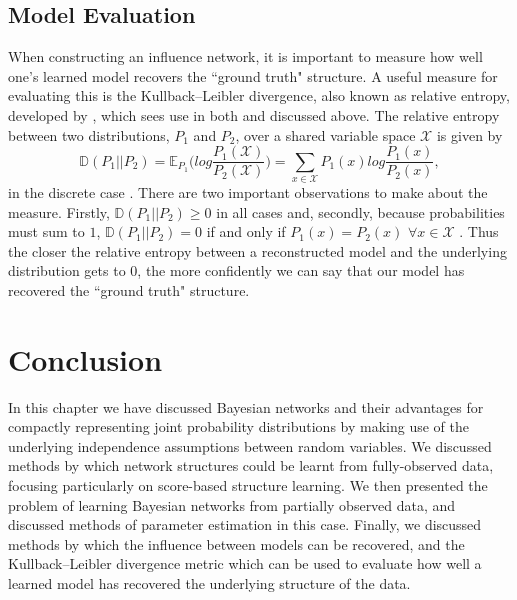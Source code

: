 \documentclass [11pt]{article}
\begin{document}
\subsection{Model Evaluation}\label{ModelEvaluation}
When constructing an influence network, it is important to measure how well one's learned model recovers the ``ground truth" structure. A useful measure for evaluating this is the Kullback–Leibler divergence, also known as relative entropy, developed by \cite{kullback1951}, which sees use in both \cite{ajoodha17} and \cite{ajoodha18} discussed above. The relative entropy between two distributions, $P_{1}$ and $P_{2}$, over a shared variable space $\mathcal{X}$ is given by
\begin{equation*}
\mathbb{D}(P_{1}||P_{2}) = \mathbb{E}_{P_{1}}\Bigg(log\frac{P_{1}(\mathcal{X})}{P_{2}(\mathcal{X})}\Bigg) = \sum_{x\in\mathcal{X}}P_{1}(x)log\frac{P_{1}(x)}{P_{2}(x)},
\end{equation*}
in the discrete case \citep{koller09}. There are two important observations to make about the measure. Firstly, $\mathbb{D}(P_{1}||P_{2}) \geq 0$ in all cases and, secondly, because probabilities must sum to $1$, $\mathbb{D}(P_{1}||P_{2}) = 0$ if and only if $P_{1}(x) = P_{2}(x)$ $\forall x\in\mathcal{X}$ \citep{koller09}. Thus the closer the relative entropy between a reconstructed model and the underlying distribution gets to $0$, the more confidently we can say that our model has recovered the ``ground truth" structure.
\section{Conclusion}
In this chapter we have discussed Bayesian networks and their advantages for compactly representing joint probability distributions by making use of the underlying independence assumptions between random variables. We discussed methods by which network structures could be learnt from fully-observed data, focusing particularly on score-based structure learning. We then presented the problem of learning Bayesian networks from partially observed data, and discussed methods of parameter estimation in this case. Finally, we discussed methods by which the influence between models can be recovered, and the Kullback–Leibler divergence metric which can be used to evaluate how well a learned model has recovered the underlying structure of the data.


\end{document}
